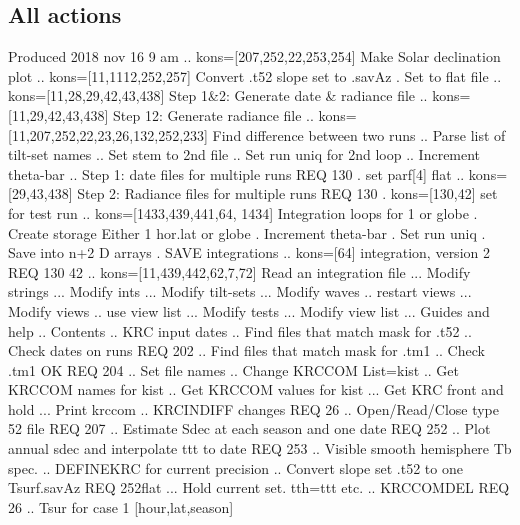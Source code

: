 \documentclass{article}
\begin{document}
\subsection{All actions}
Produced 2018 nov 16 9 am
\qi {}.. kons=[207,252,22,253,254] Make Solar declination plot
\qi {}.. kons=[11,1112,252,257] Convert .t52 slope set to .savAz
\qi {}. Set to flat file
\qi {}.. kons=[11,28,29,42,43,438] Step 1\&2: Generate date \& radiance file
\qi {}.. kons=[11,29,42,43,438] Step 12: Generate radiance file
\qi {}.. kons=[11,207,252,22,23,26,132,252,233] Find difference between two runs
\qi {}.. Parse list of tilt-set names
\qi {}.. Set stem to 2nd file
\qi {}.. Set run uniq for 2nd loop
\qi {}.. Increment theta-bar
\qi {}.. Step 1: date files for multiple runs REQ 130
\qi {}. set parf[4] flat
\qi {}.. kons=[29,43,438] Step 2: Radiance files for multiple runs REQ 130
\qi {}. kons=[130,42] set for test run
\qi {}.. kons=[1433,439,441,64, 1434] Integration loops for 1 or globe
\qi {}. Create storage  Either 1 hor.lat or globe
\qi {}. Increment theta-bar
\qi {}. Set run uniq
\qi {}. Save into n+2 D arrays
\qi {}. SAVE integrations
\qi {}.. kons=[64] integration, version 2  REQ 130 42
\qi {}.. kons=[11,439,442,62,7,72] Read an integration file
\qi {}... Modify strings
\qi {}... Modify ints
\qi {}... Modify tilt-sets
\qi {}... Modify waves
\qi {}.. restart views
\qi {}... Modify views 
\qi {}.. use view list
\qi {}... Modify tests
\qi {}... Modify view list
\qi {}... Guides and help
\qi {}.. Contents
\qi {}.. KRC input dates
\qi {}.. Find files that match mask for .t52
\qi {}.. Check dates on runs  REQ 202
\qi {}.. Find files that match mask for .tm1
\qi {}.. Check .tm1 OK  REQ 204
\qi {}.. Set file names
\qi {}.. Change KRCCOM List=kist
\qi {}.. Get KRCCOM names for kist
\qi {}.. Get KRCCOM values for kist
\qi {}... Get KRC front and hold
\qi {}... Print krccom
\qi {}.. KRCINDIFF changes REQ 26 
\qi {}.. Open/Read/Close type 52 file REQ 207
\qi {}.. Estimate Sdec at each season and one date REQ 252
\qi {}.. Plot annual sdec and interpolate ttt to date REQ 253
\qi {}.. Visible smooth hemisphere Tb spec.
\qi {}.. DEFINEKRC for current precision 
\qi {}.. Convert slope set .t52 to one Tsurf.savAz  REQ 252flat
\qi {}... Hold current set. tth=ttt etc. 
\qi {}.. KRCCOMDEL  REQ 26
\qi {}.. Tsur for case 1 [hour,lat,season]
\end{document}
